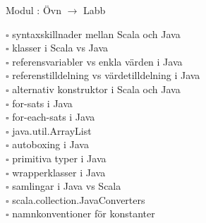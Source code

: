 
    Modul : Övn  $\rightarrow$ Labb 
    \begin{multicols}{3}\SlideFontTiny
    $\square$ syntaxskillnader mellan Scala och Java \\
$\square$ klasser i Scala vs Java \\
$\square$ referensvariabler vs enkla värden i Java \\
$\square$ referenstilldelning vs värdetilldelning i Java \\
$\square$ alternativ konstruktor i Scala och Java \\
$\square$ for-sats i Java \\
$\square$ for-each-sats i Java \\
$\square$ java.util.ArrayList \\
$\square$ autoboxing i Java \\
$\square$ primitiva typer i Java \\
$\square$ wrapperklasser i Java \\
$\square$ samlingar i Java vs Scala \\
$\square$ scala.collection.JavaConverters \\
$\square$ namnkonventioner för konstanter \\
    \end{multicols}
    